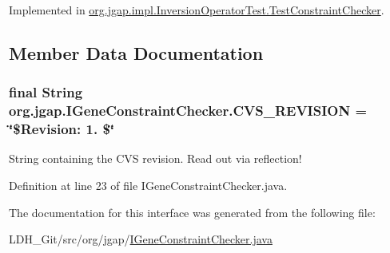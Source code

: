 Implemented in \hyperlink{classorg_1_1jgap_1_1impl_1_1_inversion_operator_test_1_1_test_constraint_checker_a6703ea3de4ce47ab66aba777f680877b}{org.\-jgap.\-impl.\-Inversion\-Operator\-Test.\-Test\-Constraint\-Checker}.



\subsection{Member Data Documentation}
\hypertarget{interfaceorg_1_1jgap_1_1_i_gene_constraint_checker_a78e823030e27800b44a2ad9faacc8ff3}{
\subsubsection[{C\-V\-S\-\_\-\-R\-E\-V\-I\-S\-I\-O\-N}]{\setlength{\rightskip}{0pt plus 5cm}final String org.\-jgap.\-I\-Gene\-Constraint\-Checker.\-C\-V\-S\-\_\-\-R\-E\-V\-I\-S\-I\-O\-N = \char`\"{}\$Revision\-: 1. \$\char`\"{}\hspace{0.3cm}{\ttfamily [static]}}}\label{interfaceorg_1_1jgap_1_1_i_gene_constraint_checker_a78e823030e27800b44a2ad9faacc8ff3}
String containing the C\-V\-S revision. Read out via reflection! 

Definition at line 23 of file I\-Gene\-Constraint\-Checker.\-java.



The documentation for this interface was generated from the following file\-:\begin{DoxyCompactItemize}
\item 
L\-D\-H\-\_\-\-Git/src/org/jgap/\hyperlink{_i_gene_constraint_checker_8java}{I\-Gene\-Constraint\-Checker.\-java}\end{DoxyCompactItemize}
